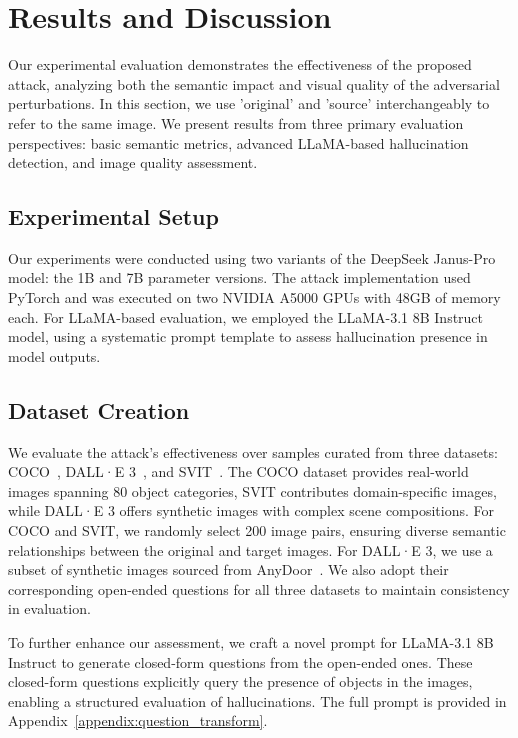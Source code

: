 \documentclass[runningheads]{llncs}
\begin{document}
\section{Results and Discussion}

Our experimental evaluation demonstrates the effectiveness of the proposed attack, analyzing both the semantic impact and visual quality of the adversarial perturbations. In this section, we use 'original' and 'source' interchangeably to refer to the same image. We present results from three primary evaluation perspectives: basic semantic metrics, advanced LLaMA-based hallucination detection, and image quality assessment.

\subsection{Experimental Setup}
Our experiments were conducted using two variants of the DeepSeek Janus-Pro model: the 1B and 7B parameter versions. The attack implementation used PyTorch and was executed on two NVIDIA A5000 GPUs with 48GB of memory each. For LLaMA-based evaluation, we employed the LLaMA-3.1 8B Instruct model, using a systematic prompt template to assess hallucination presence in model outputs. 

\subsection{Dataset Creation}
We evaluate the attack’s effectiveness over samples curated from three datasets: COCO~\cite{antol2015vqa}, DALL·E 3~\cite{betker2023improving}, and SVIT~\cite{zhao2023svit}. The COCO dataset provides real-world images spanning 80 object categories, SVIT contributes domain-specific images, while DALL·E 3 offers synthetic images with complex scene compositions. For COCO and SVIT, we randomly select 200 image pairs, ensuring diverse semantic relationships between the original and target images. For DALL·E 3, we use a subset of synthetic images sourced from AnyDoor~\cite{lu2024test}. We also adopt their corresponding open-ended questions for all three datasets to maintain consistency in evaluation.

To further enhance our assessment, we craft a novel prompt for LLaMA-3.1 8B Instruct to generate closed-form questions from the open-ended ones. These closed-form questions explicitly query the presence of objects in the images, enabling a structured evaluation of hallucinations. The full prompt is provided in Appendix~\ref{appendix:question_transform}.
\end{document}
